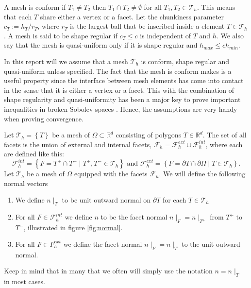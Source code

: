  A mesh is conform if $T_{1} \neq T_{2 }$  then $T_{1} \cap T_{2} \neq \emptyset  $ for all $T_{1}, T_{2} \in \mathcal{T}_{h}$. This means that each $T$ share either a vertex or a facet.
Let the chunkiness parameter $c_{T} := h_{T}/r_{T}$, where $r_{T}$  is the largest ball that be inscribed inside a element $T \in \mathcal{T}_{h} $.
A mesh is said to be shape regular if $c_{T}\le  c$ is independent of $T$  and $h$. We also say that the mesh is quasi-uniform only if it is shape regular and $h_{max} \le  c h_{min}$.

In this report will we assume that a mesh $\mathcal{T}_{h} $ is conform, shape regular and quasi-uniform unless specified.
 The fact that the mesh is conform makes is a useful property since the interface between mesh elements has come into contact in the sense
that it is either a vertex or a facet. This with the combination of shape regularity and quasi-uniformity has been a major key to prove important inequalities in broken Sobolev spaces \cite[Chapter 1.4.1]{pietro2012}. Hence, the assumptions are very handy when proving convergence.


Let $\mathcal{T}_{h}  = \left\{ T \right\} $ be a mesh of $\Omega \subset  \mathbb{R} ^d $ consisting of polygons $T \in \mathbb{R} ^{d}$.
The set of all facets is the union of external and internal facets, $\mathcal{F} _{h} = \mathcal{F} ^{ext}_{h} \cup \mathcal{F} _{h}^{int} $, where each are defined like this:
\[
            \mathcal{F}^{int} _{h}  = \left\{ F=T^{+}\cap T^{-}  \mid  T^{+}, T^{-} \in \mathcal{T}_{h}  \right\} \text{ and }
            \mathcal{F}^{ext} _{h}  = \left\{ F= \partial T \cap \partial \Omega    \mid  T  \in \mathcal{T}_{h}  \right\}.
\]
Let $\mathcal{T}_{h} $ be a mesh of $\Omega $ equipped with the facets $\mathcal{F}_{h} $. We will define the following normal vectors
\begin{enumerate}[label=\arabic*)]
    \item We define $n \mid _{T}$ to be unit outward normal on $\partial T$ for each $T \in \mathcal{T}_{h} $
 \item For all $F \in \mathcal{F }^{int} _{h}$ we define $n$ to be the facet normal $ n  \mid_F = n \mid _{T^{+}} $  from $T^{+}$ to $T^{-}$, illustrated in figure \ref{fig:normal}.
 \item For all $F \in F^{ext}_{h}$ we define the facet normal $n \mid _{F} = n \mid _{T} $ to the unit outward normal.
\end{enumerate}
Keep in mind that in many that we often will simply use the notation $n = n \mid _{T}$ in most cases.


